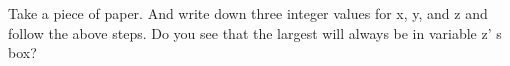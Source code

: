 Take a piece of paper. And write down three integer values for x, y, and z and follow the above steps. Do you see that the largest will always be in variable z' s box?

